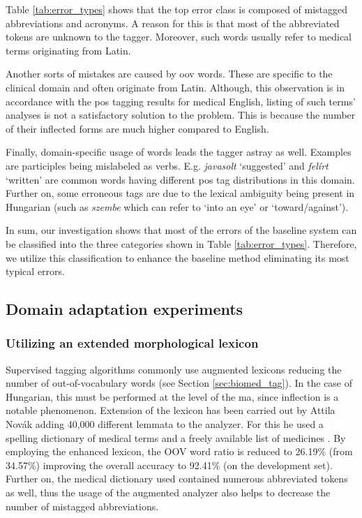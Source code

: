 Table \ref{tab:error_types} shows that the top error class is composed of mistagged abbreviations and acronyms. 
A reason for this is that most of the abbreviated tokens are unknown to the tagger. 
Moreover, such words usually refer to medical terms originating from Latin.

Another sorts of mistakes are caused by \acrlong{oov} words. 
These are specific to the clinical domain and often originate from Latin.
Although, this observation is in accordance with the \acrshort{pos} tagging results for medical English, listing of such terms' analyses is not a satisfactory solution to the problem. 
This is because the number of their inflected forms are much higher compared to English. 

Finally, domain-specific usage of words leads the tagger astray as well. 
Examples are participles being mislabeled as verbs. 
E.g. \textit{javasolt} `suggested’  and  \textit{felírt} `written’ are common words having different \acrshort{pos} tag distributions in this domain. 
Further on, some erroneous tags are due to the lexical ambiguity being present in Hungarian (such as \textit{szembe} which can refer to `into an eye’ or `toward/against’). 



In sum, our investigation shows that most of the errors of the baseline system can be classified into the three categories shown in Table \ref{tab:error_types}. 
Therefore, we utilize this classification to enhance the baseline method eliminating its most typical errors.

\subsection{Domain adaptation experiments}


\subsubsection{Utilizing an extended morphological lexicon}
\label{sec:ma-extension}

Supervised tagging algorithms commonly use augmented lexicons reducing the number of out-of-vocabulary words (see Section \ref{sec:biomed_tag}). 
In the case of Hungarian, this must be performed at the level of the \acrlong{ma}, since inflection is a notable phenomenon. 
Extension of the lexicon has been carried out by Attila Novák \cite{Orosz2014} adding 40,000 different lemmata to the analyzer. 
For this he used a spelling dictionary of medical terms \cite{Fabian1992} and a freely available list of medicines \cite{Foigazgatosag2012}.
By employing the enhanced lexicon, the OOV word ratio is reduced to 26.19\% (from 34.57\%) improving the overall accuracy to 92.41\% (on the development set). 
Further on, the medical dictionary \cite{Fabian1992} used contained numerous abbreviated tokens as well, thus the usage of the augmented analyzer also helps to decrease the number of mistagged abbreviations.

